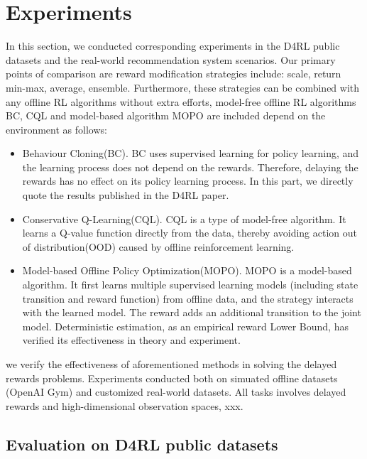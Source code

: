\section{Experiments}

In this section, we conducted corresponding experiments in the D4RL public datasets and the real-world recommendation system scenarios. Our primary points of comparison are reward modification strategies include: scale, return min-max, average, ensemble. Furthermore, these strategies can be combined with any offline RL algorithms without extra efforts, model-free offline RL algorithms BC, CQL and model-based algorithm MOPO are included depend on the environment as follows:

\begin{itemize}
    \item Behaviour Cloning(BC). BC uses supervised learning for policy learning, and the learning process does not depend on the rewards. Therefore, delaying the rewards has no effect on its policy learning process. In this part, we directly quote the results published in the D4RL paper.
    
    \item Conservative Q-Learning(CQL). CQL is a type of model-free algorithm. It learns a Q-value function directly from the data, thereby avoiding action out of distribution(OOD) caused by offline reinforcement learning.
    
    \item Model-based Offline Policy Optimization(MOPO). MOPO is a model-based algorithm. It first learns multiple supervised learning models (including state transition and reward function) from offline data, and the strategy interacts with the learned model. The reward adds an additional transition to the joint model. Deterministic estimation, as an empirical reward Lower Bound, has verified its effectiveness in theory and experiment.
    
\end{itemize}

we verify the effectiveness of aforementioned methods in solving the delayed rewards problems. Experiments conducted both on simuated offline datasets (OpenAI Gym) and customized real-world datasets. All tasks involves delayed rewards and high-dimensional observation spaces, xxx.

\subsection{Evaluation on D4RL public datasets}

